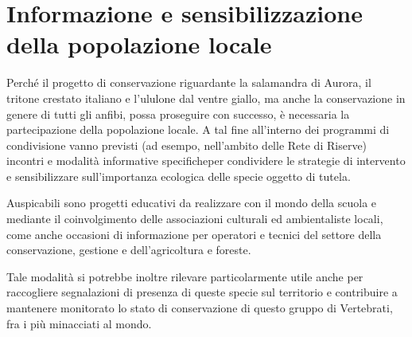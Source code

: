 \documentclass[10pt,twoside,openany,x11names,svgnames,italian,a5paper,dvipsnames,table]{memoir}
\newcommand{\ph}{\emph{Ph}. }
\begin{document}
\section{Informazione e sensibilizzazione della popolazione locale}
Perché il progetto di conservazione riguardante la salamandra di Aurora, il tritone crestato italiano e l’ululone dal ventre giallo, ma anche la conservazione in genere di tutti gli anfibi, possa proseguire con successo, è necessaria la partecipazione della popolazione locale. A tal fine all’interno dei programmi di condivisione vanno previsti (ad esempo, nell’ambito delle Rete di Riserve) incontri e modalità informative specificheper condividere le strategie di intervento e sensibilizzare sull’importanza ecologica delle specie oggetto di tutela.

Auspicabili sono progetti educativi da realizzare con il mondo della scuola e mediante il coinvolgimento delle associazioni culturali ed ambientaliste locali, come anche occasioni di informazione per operatori e tecnici del settore della conservazione, gestione e dell’agricoltura e foreste.

Tale modalità si potrebbe inoltre rilevare particolarmente utile anche per raccogliere segnalazioni di presenza di queste specie sul territorio e  contribuire a mantenere monitorato lo stato di conservazione di questo gruppo di Vertebrati, fra i più minacciati al mondo.

\begin{comment}
\vspace*{\fill}
\begin{center}
\texttt{[image: menegon\_tritone\_crestato\_neotenia.jpg]}
\end{center}
\captionof*{figure}{\textbf{Tritone crestato italiano} \emph{Triturus carnifex}. Le larve di Tritone crestato italiano, come molte larve che si sviluppano in pozze povere di ossigeno, hanno branchie frangiate particolarmente lunghe, che facilitano lo scambio di gas per la respirazione (\ph Michele Menegon).}
\vspace*{\fill}
\end{comment} 

\setlength\afterchapskip{10mm}
\end{document}
